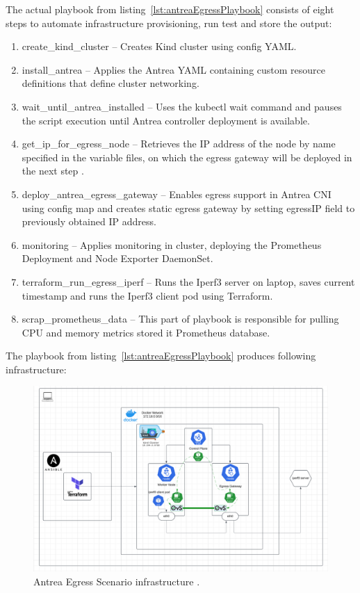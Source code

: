 The actual playbook from listing~\ref{lst:antreaEgressPlaybook} consists of eight steps to automate infrastructure provisioning, run test and store the output:
\begin{enumerate}
  \item create\_kind\_cluster -- Creates Kind cluster using config YAML.
  \item install\_antrea -- Applies the Antrea YAML containing custom resource definitions that define cluster networking.
  \item wait\_until\_antrea\_installed -- Uses the kubectl wait command and pauses the script execution until Antrea controller deployment is available.
  \item get\_ip\_for\_egress\_node -- Retrieves the IP address of the node by name specified in the variable files, on which the egress gateway will be deployed in the next step .
  \item deploy\_antrea\_egress\_gateway -- Enables egress support in Antrea CNI using config map and creates static egress gateway by setting egressIP field to previously obtained IP address.
  \item monitoring -- Applies monitoring in cluster, deploying the Prometheus Deployment and Node Exporter DaemonSet.
  \item terraform\_run\_egress\_iperf -- Runs the Iperf3 server on laptop, saves current timestamp and runs the Iperf3 client pod using Terraform.
  \item scrap\_prometheus\_data -- This part of playbook is responsible for pulling CPU and memory metrics stored it Prometheus database.
\end{enumerate}

The playbook from listing~\ref{lst:antreaEgressPlaybook} produces following infrastructure:

\begin{figure}[tbh]
  \centering
  \includegraphics[width=1\columnwidth]{images/antrea_egress_gatateway_cluster.png}
  \caption{Antrea Egress Scenario infrastructure \cite{AntreaDocs}\cite{NGINX}.}
  \label{fig:antreaEgressScenarioArch}
\end{figure}

